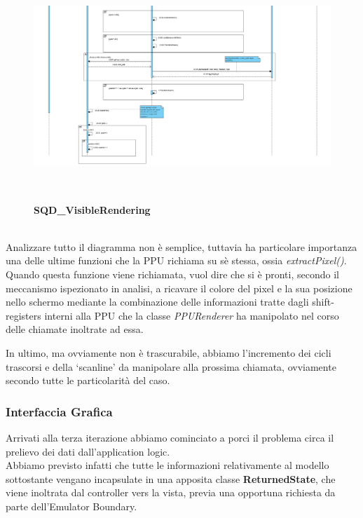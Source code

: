 \documentclass[11pt]{article}
\begin{document}
\begin{figure}[!h]
\hspace*{-4.3cm}
\centering
\includegraphics[width=600px, height=325px]{SQD_VisibleRendering_2}\\
	\small\textbf{SQD\_VisibleRendering}
\end{figure}\\
Analizzare tutto il diagramma non è semplice, tuttavia ha particolare importanza una delle ultime funzioni che la PPU richiama su sè stessa, ossia \emph{extractPixel()}. Quando questa funzione viene richiamata, vuol dire che si è pronti, secondo il meccanismo ispezionato in analisi, a ricavare il colore del pixel e la sua posizione nello schermo mediante la combinazione delle informazioni tratte dagli shift-registers interni alla PPU che la classe \emph{PPURenderer} ha manipolato nel corso delle chiamate inoltrate ad essa.

In ultimo, ma ovviamente non è trascurabile, abbiamo l'incremento dei cicli trascorsi e della `scanline' da manipolare alla prossima chiamata, ovviamente secondo tutte le particolarità del caso.

\clearpage

\subsubsection{Interfaccia Grafica}

Arrivati alla terza iterazione abbiamo cominciato a porci il problema circa il prelievo dei dati dall'application logic.\\
Abbiamo previsto infatti che tutte le informazioni relativamente al modello sottostante vengano incapsulate in una apposita classe \textbf{ReturnedState}, che viene inoltrata dal controller vers la vista, previa una opportuna richiesta da parte dell'Emulator Boundary.\\
\end{document}
